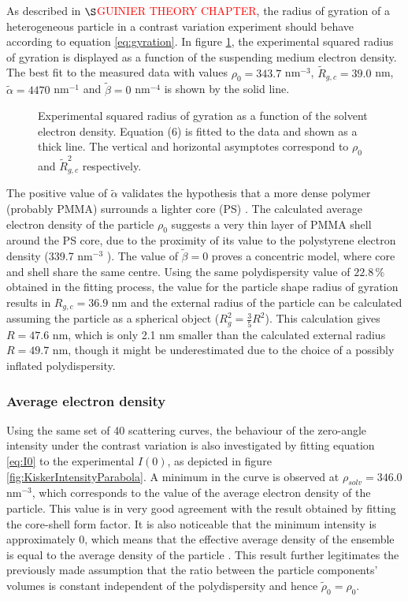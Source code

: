 As described in \(\S\)\textcolor{red}{GUINIER THEORY CHAPTER}, the radius of gyration of a heterogeneous particle in a contrast variation experiment should behave according to equation \eqref{eq:gyration}. In figure \ref{fig:KiskerGuinierRadius}, the experimental squared radius of gyration is displayed as a function of the suspending medium electron density. The best fit to the measured data with values \(\rho_0=343.7\) nm\(^{-3}\), \( \tilde R_{g,c}=39.0\) nm, \(\tilde \alpha=4470\) nm\(^{-1}\) and \(\tilde\beta=0\) nm\(^{-4}\) is shown by the solid line. 

\begin{figure}%
	\centering
		
		\caption{Experimental squared radius of gyration as a function of the solvent electron density. Equation (6) is fitted to the data and shown as a thick line. The vertical and horizontal asymptotes correspond to $\rho_0$ and $\tilde R^2_{g,c}$ respectively.}
		\label{fig:KiskerGuinierRadius}
\end{figure}

The positive value of \(\tilde\alpha\) validates the hypothesis that a more dense polymer (probably PMMA) surrounds a lighter core (PS) \cite{stuhrmann_small-angle_2008}. The calculated average electron density of the particle \(\rho_0\) suggests a very thin layer of PMMA shell around the PS core, due to the proximity of its value to the polystyrene electron density (339.7 nm\(^{-3}\) ). The value of \( \tilde\beta=0\) proves a concentric model, where core and shell share the same centre. Using the same polydispersity value of \(22.8\,\%\) obtained in the fitting process, the value for the particle shape radius of gyration results in \(R_{g,c}=36.9\) nm and the external radius of the particle can be calculated assuming the particle as a spherical object (\( R_g^2=\frac{3}{5}R^2 \)). This calculation gives \( R=47.6\) nm, which is only 2.1 nm smaller than the calculated external radius \(R=49.7\) nm, though it might be underestimated due to the choice of a possibly inflated polydispersity. 

\subsubsection{Average electron density}
Using the same set of 40 scattering curves, the behaviour of the zero-angle intensity under the contrast variation is also investigated by fitting equation \eqref{eq:I0} to the experimental \(I(0)\), as depicted in figure \ref{fig:KiskerIntensityParabola}. A minimum in the curve is observed at \(\rho_{solv}=346.0\) nm\(^{-3}\), which corresponds to the value of the average electron density of the particle. This value is in very good agreement with the result obtained by fitting the core-shell form factor. It is also noticeable that the minimum intensity is approximately 0, which means that the effective average density of the ensemble is equal to the average density of the particle \cite{avdeev_contrast_2007}. This result further legitimates the previously made assumption that the ratio between the particle components' volumes is constant independent of the polydispersity and hence \(  \tilde \rho_0 = \rho_0  \).

